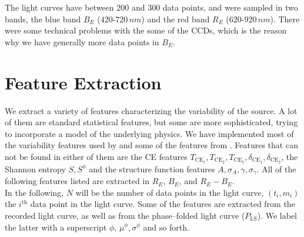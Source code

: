 The light curves have between 200 and 300 data points, and were sampled in two bands, the blue band $B_E$ ($420$-$720 \, \unit{nm}$) and the red band $R_E$ ($620$-$920 \, \unit{nm}$). There were some technical problems with the some of the CCDs, which is the reason why we have generally more data points in $B_E$.

\section{Feature Extraction}
\label{sec:feature-extraction}

We extract a variety of features characterizing the variability of the source. A lot of them are standard statistical features, but some are more sophisticated, trying to incorporate a model of the underlying physics. We have implemented most of the variability features used by \citet{kim2014} and some of the features from \citet{dubath2011}. Features that can not be found in either of them are the CE features $T_{\text{CE}_1}, T_{\text{CE}_2}, T_{\text{CE}_3}, \delta_{\text{CE}_1}, \delta_{\text{CE}_2}$, the Shannon entropy $S, S^\phi$ and the structure function features $A, \sigma_A, \gamma, \sigma_\gamma$. All of the following features listed are extracted in $R_E$, $B_E$, and $R_E - B_E$.\\

In the following, $N$ will be the number of data points in the light curve, $(t_i, m_i)$ the $i^{\text{th}}$ data point in the light curve. Some of the features are extracted from the recorded light curve, as well as from the phase--folded light curve ($P_{\text{LS}}$). We label the latter with a superscript $\phi$, \eg $\mu^\phi, \sigma^\phi$ and so forth.

